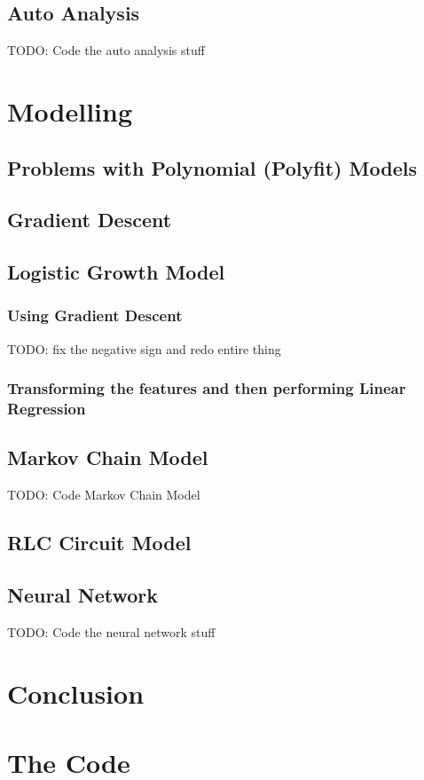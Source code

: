\documentclass{report}
\begin{document}
        \subsection{Auto Analysis}
            \label{sec:auto}
            TODO: Code the auto analysis stuff
    \section{Modelling}
        \subsection{Problems with Polynomial (Polyfit) Models}
        \label{sec:problems}
        \subsection{Gradient Descent}
        \subsection{Logistic Growth Model}
            \subsubsection{Using Gradient Descent}
                TODO: fix the negative sign and redo entire thing
            \subsubsection{Transforming the features and then performing Linear Regression}
        \subsection{Markov Chain Model}
            TODO: Code Markov Chain Model
        \subsection{RLC Circuit Model}
        \subsection{Neural Network}
            TODO: Code the neural network stuff
    \section{Conclusion}
    \section{The Code}
\end{document}

